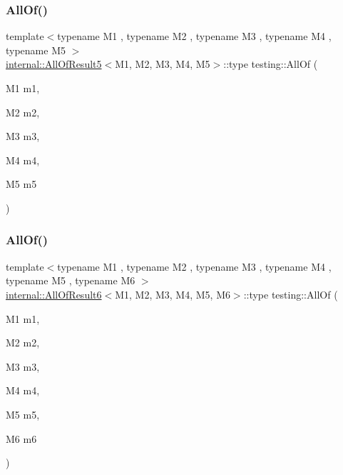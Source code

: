\subsubsection{\texorpdfstring{AllOf()}{AllOf()}\hspace{0.1cm}{\footnotesize\ttfamily [4/9]}}
{\footnotesize\ttfamily template$<$typename M1 , typename M2 , typename M3 , typename M4 , typename M5 $>$ \\
\mbox{\hyperlink{structtesting_1_1internal_1_1AllOfResult5}{internal\+::\+All\+Of\+Result5}}$<$M1, M2, M3, M4, M5$>$\+::type testing\+::\+All\+Of (\begin{DoxyParamCaption}\item[{M1}]{m1,  }\item[{M2}]{m2,  }\item[{M3}]{m3,  }\item[{M4}]{m4,  }\item[{M5}]{m5 }\end{DoxyParamCaption})\hspace{0.3cm}{\ttfamily [inline]}}

\mbox{\label{namespacetesting_afc8e2d405f80e7d3df32842ddb648125}} 
\subsubsection{\texorpdfstring{AllOf()}{AllOf()}\hspace{0.1cm}{\footnotesize\ttfamily [5/9]}}
{\footnotesize\ttfamily template$<$typename M1 , typename M2 , typename M3 , typename M4 , typename M5 , typename M6 $>$ \\
\mbox{\hyperlink{structtesting_1_1internal_1_1AllOfResult6}{internal\+::\+All\+Of\+Result6}}$<$M1, M2, M3, M4, M5, M6$>$\+::type testing\+::\+All\+Of (\begin{DoxyParamCaption}\item[{M1}]{m1,  }\item[{M2}]{m2,  }\item[{M3}]{m3,  }\item[{M4}]{m4,  }\item[{M5}]{m5,  }\item[{M6}]{m6 }\end{DoxyParamCaption})\hspace{0.3cm}{\ttfamily [inline]}}

\mbox{\label{namespacetesting_acbd4eef50126ff6db5b93ac5faa71b45}} 

